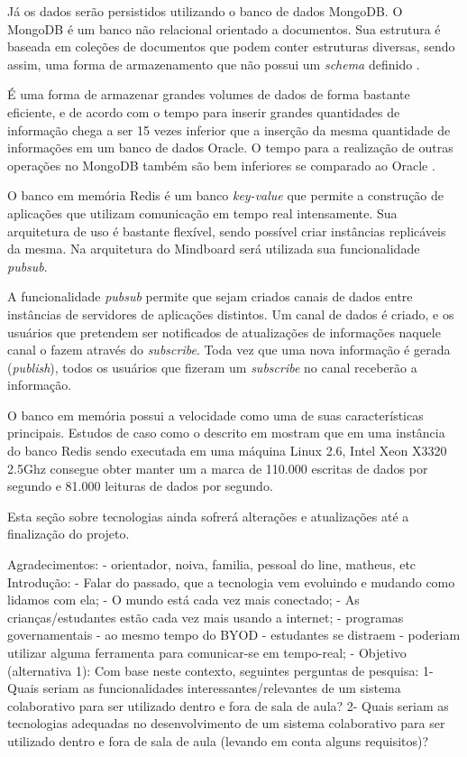 Já os dados serão persistidos utilizando o banco de dados MongoDB. O MongoDB é um banco não relacional orientado a documentos. Sua estrutura é baseada em coleções de documentos que podem conter estruturas diversas, sendo assim, uma forma de armazenamento que não possui um \emph{schema} definido \cite{mongodb}. 

É uma forma de armazenar grandes volumes de dados de forma bastante eficiente, e de acordo com \cite{mongodb} o tempo para inserir grandes quantidades de informação chega a ser 15 vezes inferior que a inserção da mesma quantidade de informações em um banco de dados Oracle. O tempo para a realização de outras operações no MongoDB também são bem inferiores se comparado ao Oracle \cite{mongodb}.

O banco em memória Redis \cite{redis_site} é um banco \emph{key-value} que permite a construção de aplicações que utilizam comunicação em tempo real intensamente. Sua arquitetura de uso é bastante flexível, sendo possível criar instâncias replicáveis da mesma. Na arquitetura do Mindboard será utilizada sua funcionalidade \emph{pubsub}.

A funcionalidade \emph{pubsub} \cite{redis_pubsub} permite que sejam criados canais de dados entre instâncias de servidores de aplicações distintos. Um canal de dados é criado, e os usuários que pretendem ser notificados de atualizações de informações naquele canal o fazem através do \emph{subscribe}. Toda vez que uma nova informação é gerada (\emph{publish}), todos os usuários que fizeram um \emph{subscribe} no canal receberão a informação.


O banco em memória possui a velocidade como uma de suas características principais. Estudos de caso como o descrito em \cite{redis_perf} mostram que em uma instância do banco Redis sendo executada em uma máquina Linux 2.6, Intel Xeon X3320 2.5Ghz consegue obter manter um a marca de 110.000 escritas de dados por segundo e 81.000 leituras de dados por segundo.

Esta seção sobre tecnologias ainda sofrerá alterações e atualizações até a finalização do projeto.








\iffalse
        Agradecimentos: 
            - orientador, noiva, familia, pessoal do line, matheus, etc
        Introdução:
            - Falar do passado, que a tecnologia vem evoluindo e mudando como lidamos com ela;
            - O mundo está cada vez mais conectado;
            - As crianças/estudantes estão cada vez mais usando a internet;
            - programas governamentais 
            - ao mesmo tempo do BYOD
                - estudantes se distraem
                - poderiam utilizar alguma ferramenta para comunicar-se em tempo-real;
            - Objetivo (alternativa 1):
                Com base neste contexto, seguintes perguntas de pesquisa:
                    1- Quais seriam as funcionalidades interessantes/relevantes de um sistema colaborativo para ser utilizado dentro e fora de sala de aula?
                    2- Quais seriam as tecnologias adequadas no desenvolvimento de um sistema colaborativo para ser utilizado dentro e fora de sala de aula (levando em conta alguns requisitos)?


